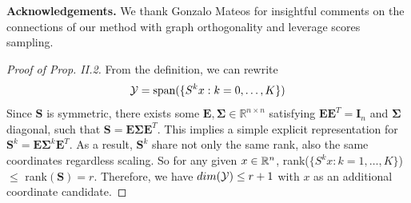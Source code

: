 \documentclass[conference]{IEEEtran}
\theoremstyle{definition}
\begin{document}



\noindent \textbf{Acknowledgements.} We thank Gonzalo Mateos for insightful comments on the connections of our method with graph orthogonality and leverage scores sampling.




\newpage 
\clearpage

\appendix 
\begin{proof}[Proof of Prop. II.2]
  From the definition, we can rewrite 
    $${\mathcal Y} = \text{span}(\{S^kx : k=0, \ldots, K\})$$
    Since $\mathbf{S}$ is symmetric, there exists some $\mathbf{E}, \mathbf{\Sigma} \in \mathbb{R}^{n \times n}$ satisfying $\mathbf{E}\mathbf{E}^T = \mathbf{I}_n$ and $\mathbf{\Sigma}$ diagonal, such that $\mathbf{S} = \mathbf{E}\mathbf{\Sigma}\mathbf{E}^T$. This implies a simple explicit representation for $\mathbf{S}^k = \mathbf{E}\mathbf{\Sigma}^k\mathbf{E}^T$. As a result, $\mathbf{S}^k$ share not only the same rank, also the same coordinates regardless scaling. So for any given $x\in {\mathbb R}^n$, rank($\{S^kx : k=1, \ldots, K\}$) $\leq$ rank$(\mathbf{S}) = r$. Therefore, we have $dim({\mathcal Y}) \leq r+1$ with $x$ as an additional coordinate candidate.
\end{proof}
\end{document}
